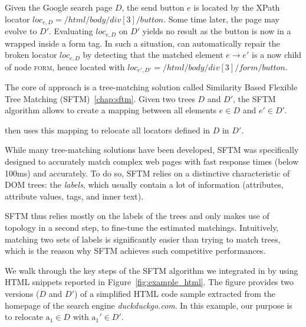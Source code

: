 \begin{ex}
Given the Google search page $D$, the send button $e$ is located by the XPath locator $loc_{e,D} = /html/body/div[3]/button$.
Some time later, the page may evolve to $D'$.
Evaluating $loc_{e,D}$ on $D'$ yields no result as the button is now in a wrapped inside a \textsf{form} tag.
In such a situation, \erratum{} can automatically repair the broken locator $loc_{e,D}$ by detecting that the matched element $e \to e'$ is a now child of node \textsc{form}, hence located with $loc_{e',D'} = /html/body/div[3]/form/button$.
\end{ex}

The core of \erratum approach is a tree-matching solution called Similarity Based Flexible Tree Matching (SFTM)~\ref{chap:sftm}. 
Given two trees $D$ and $D'$, the SFTM algorithm allows to create a mapping between all elements $e \in D$ and $e' \in D'$.

\erratum then uses this mapping to relocate all locators defined in $D$ in $D'$.

While many tree-matching solutions have been developed, SFTM was specifically designed to accurately match complex web pages with fast response times (below 100ms) and accurately.
To do so, SFTM relies on a distinctive characteristic of DOM trees: the \emph{labels}, which usually contain a lot of information (attributes, attribute values, tags, and inner text).

SFTM thus relies mostly on the labels of the trees and only makes use of topology in a second step, to fine-tune the estimated matchings.
Intuitively, matching two sets of labels is significantly easier than trying to match trees, which is the reason why SFTM achieves such competitive performances.

We walk through the key steps of the SFTM algorithm we integrated in \erratum{} by using HTML snippets reported in Figure~\ref{fig:example_html}.
The figure provides two versions ($D$ and $D'$) of a simplified HTML code sample extracted from the homepage of the search engine \textit{duckduckgo.com}.
In this example, our purpose is to relocate $\text{a}_1 \in D$ with $\text{a}_1' \in D'$.

